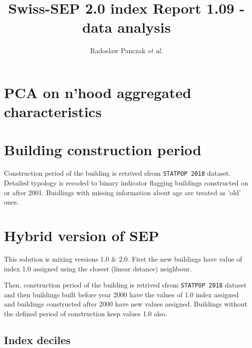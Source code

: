 \documentclass[a4paper, notitlepage, fleqn]{article} %
\title{\textbf{Swiss-SEP 2.0 index \endgraf 
Report 1.09 - data analysis}}
\author{Radoslaw Panczak \textit{et al.}}
\begin{document}
\maketitle
\tableofcontents

\newpage
\section{PCA on n'hood aggregated characteristics}
\begin{stlog}\end{stlog}
\newpage
\section{Building construction period}

Construction period of the building is retrived sfrom \texttt{STATPOP 2018} dataset. Detailed typology is recoded to binary indicator flagging 
buildings constructed on or after 2001. Buidlings with missing information about age are treated as 'old' ones. 
\begin{stlog}\end{stlog}
\newpage
\section{Hybrid version of SEP}

This solution is mixing versions 1.0 \& 2.0. First the new buildings have value of index 1.0 assigned using the closest (linear dstance) neighbour. 

Then, construction period of the building is retrived sfrom \texttt{STATPOP 2018} dataset and then buildings built before year 2000 have the values of 1.0 index assigned and buildings constructed after 2000 have new values assigned. Buildings without the defined period of construction keep values 1.0 also. 
\subsection{Index deciles}
\begin{stlog}\end{stlog}
\end{document}
